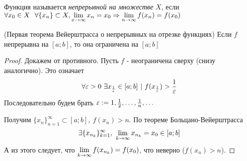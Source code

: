 \begin{definition}
	Функция называется \textit{непрерывной на множестве} $X$, если $\forall x_0 \in X\ \ \forall \{x_n\} \subset X, \lim\limits_{x \to \infty} x_n = x_0 \Rightarrow \lim\limits_{n \to \infty} f(x_n) = f(x_0)$
\end{definition}

\begin{theorem} (Первая теорема Вейерштрасса о непрерывных на отрезке функциях)
	Если $f$ непрерывна на $[a; b]$, то она ограничена на $[a; b]$
\end{theorem}

\begin{proof}
	Докажем от противного. Пусть $f$ - неограничена сверху (снизу аналогично). Это означает
	$$
		\forall \varepsilon > 0\ \exists x_{\frac{1}{\varepsilon}} \in [a; b]\ |\ f(x_{\frac{1}{\varepsilon}}) > \frac{1}{\varepsilon}
	$$
	Последовательно будем брать $\varepsilon := 1, \frac{1}{2}, \dots, \frac{1}{n}, \dots$
	
	Получим $\{x_n\}_{n = 1}^\infty \subset [a; b],\ f(x_n) > n$. По теореме Больцано-Вейерштрасса
	$$
		\exists \{x_{n_k}\}_{k = 1}^\infty,\ \lim\limits_{k \to \infty} x_{n_k} = x_0 \in [a; b]
	$$
	А из этого следует, что $\lim\limits_{k \to \infty} f(x_{n_k}) = f(x_0)$, что неверно ($f(x_n) > n$).
\end{proof}